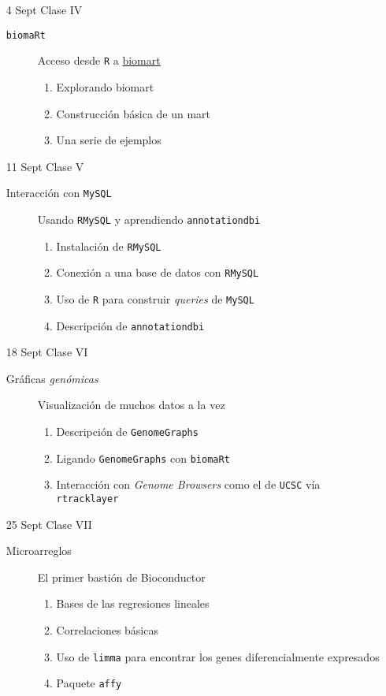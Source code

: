 \documentclass[letterpaper,12pt]{article}
\newcommand{\pl}[1]{\texttt{#1}}
\newcommand{\myurlshort}[2]{\href{http://#1}{{\textsf{#2}}}}
\begin{document}
\begin{itemize}
  \item[4 Sept] Clase IV
  \begin{description}
  \item[\pl{biomaRt}] Acceso desde \pl{R} a \myurlshort{biomart.org}{biomart}
  \begin{enumerate}
  \item Explorando biomart
  \item Construcción básica de un mart
  \item Una serie de ejemplos
  \end{enumerate}
  \end{description}
  
  \item[11 Sept] Clase V
  \begin{description}
  \item[Interacción con \pl{MySQL}] Usando \pl{RMySQL} y aprendiendo \pl{annotationdbi}
  \begin{enumerate}
  \item Instalación de \pl{RMySQL}
  \item Conexión a una base de datos con \pl{RMySQL}
  \item Uso de \pl{R} para construir \emph{queries} de \pl{MySQL}
  \item Descripción de \pl{annotationdbi}
  \end{enumerate}
  \end{description}
  
  \item[18 Sept] Clase VI
  \begin{description}
  \item[Gráficas \emph{genómicas}] Visualización de muchos datos a la vez
  \begin{enumerate}
  \item Descripción de \pl{GenomeGraphs}
  \item Ligando \pl{GenomeGraphs} con \pl{biomaRt}
  \item Interacción con \emph{Genome Browsers} como el de \pl{UCSC} vía \pl{rtracklayer}
  \end{enumerate}
  \end{description}
  
  \item[25 Sept] Clase VII
  \begin{description}
  \item[Microarreglos] El primer bastión de Bioconductor
  \begin{enumerate}
  \item Bases de las regresiones lineales
  \item Correlaciones básicas
  \item Uso de \pl{limma} para encontrar los genes diferencialmente expresados
  \item Paquete \pl{affy}
  \end{enumerate}
  \end{description}
  

\end{itemize}
\end{document}
